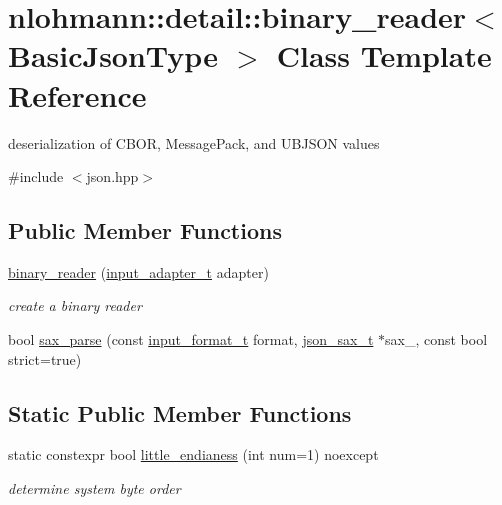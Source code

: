 \hypertarget{classnlohmann_1_1detail_1_1binary__reader}{}\section{nlohmann\+:\+:detail\+:\+:binary\+\_\+reader$<$ Basic\+Json\+Type $>$ Class Template Reference}
\label{classnlohmann_1_1detail_1_1binary__reader}


deserialization of C\+B\+OR, Message\+Pack, and U\+B\+J\+S\+ON values  




{\ttfamily \#include $<$json.\+hpp$>$}

\subsection*{Public Member Functions}
\begin{DoxyCompactItemize}
\item 
\hyperlink{classnlohmann_1_1detail_1_1binary__reader_a7e643baadaf4c31718cd74833bdd542f}{binary\+\_\+reader} (\hyperlink{namespacenlohmann_1_1detail_ae132f8cd5bb24c5e9b40ad0eafedf1c2}{input\+\_\+adapter\+\_\+t} adapter)
\begin{DoxyCompactList}\small\item\em create a binary reader \end{DoxyCompactList}\item 
bool \hyperlink{classnlohmann_1_1detail_1_1binary__reader_a68ef932b48547bc4e6ce1df2856f6b8f}{sax\+\_\+parse} (const \hyperlink{namespacenlohmann_1_1detail_aa554fc6a11519e4f347deb25a9f0db40}{input\+\_\+format\+\_\+t} format, \hyperlink{structnlohmann_1_1json__sax}{json\+\_\+sax\+\_\+t} $\ast$sax\+\_\+, const bool strict=true)
\end{DoxyCompactItemize}
\subsection*{Static Public Member Functions}
\begin{DoxyCompactItemize}
\item 
static constexpr bool \hyperlink{classnlohmann_1_1detail_1_1binary__reader_a1d8f70f95d241354f86a0b9ae711c1c3}{little\+\_\+endianess} (int num=1) noexcept
\begin{DoxyCompactList}\small\item\em determine system byte order \end{DoxyCompactList}\end{DoxyCompactItemize}


